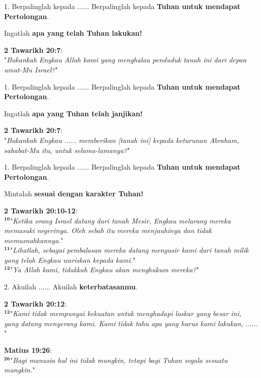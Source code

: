\documentclass[pdf]{beamer}
\theoremstyle{mystyle}
\begin{document}
\begin{frame}{1. Berpalinglah kepada $\ldots \ldots$}
	Berpalinglah kepada \textbf{Tuhan untuk mendapat Pertolongan}.
	
	\bigskip
	Ingatlah \textbf{apa yang telah Tuhan lakukan!}
	
	\bigskip
	\textbf{2 Tawarikh 20:7}: \\
	 "\textit{Bukankah Engkau Allah kami yang menghalau penduduk tanah ini dari depan umat-Mu Israel?}"	
	
\end{frame}

\begin{frame}{1. Berpalinglah kepada $\ldots \ldots$}
	Berpalinglah kepada \textbf{Tuhan untuk mendapat Pertolongan}.
	
	\bigskip
	Ingatlah \textbf{apa yang Tuhan telah janjikan!}
	
	\bigskip
	\textbf{2 Tawarikh 20:7}: \\
	 "\textit{Bukankah Engkau $\ldots \ldots$ memberikan [tanah ini] kepada keturunan Abraham, sahabat-Mu itu, untuk selama-lamanya?}"	
	
\end{frame}

\begin{frame}{1. Berpalinglah kepada $\ldots \ldots$}
	Berpalinglah kepada \textbf{Tuhan untuk mendapat Pertolongan}.
	
	\bigskip
	Mintalah \textbf{sesuai dengan karakter Tuhan!}
	
	\bigskip
	\textbf{2 Tawarikh 20:10-12}: \\
	 $^{\bm{10}}$"\textit{Ketika orang Israel datang dari tanah Mesir, Engkau melarang mereka memasuki negerinya. Oleh sebab itu mereka menjauhinya dan tidak memusnahkannya.}"	 \\
	 $^{\bm{11}}$"\textit{Lihatlah, sebagai pembalasan mereka datang mengusir kami dari tanah milik yang telah Engkau wariskan kepada kami.}" \\
	 $^{\bm{12}}$"\textit{Ya Allah kami, tidakkah Engkau akan menghukum mereka?}"	
\end{frame}

\begin{frame}{2. Akuilah $\ldots \ldots$}
	Akuilah \textbf{keterbatasanmu}.
	
	\bigskip
	\textbf{2 Tawarikh 20:12}: \\
	 $^{\bm{12}}$"\textit{Kami tidak mempunyai kekuatan untuk menghadapi laskar yang besar ini, yang datang menyerang kami. Kami tidak tahu apa yang harus kami lakukan, $\ldots \ldots$}"
	 
	\bigskip

	\textbf{Matius 19:26}: \\
	 $^{\bm{26}}$"\textit{Bagi manusia hal ini tidak mungkin, tetapi bagi Tuhan segala sesuatu mungkin.}"
	 
\end{frame}
\end{document}
